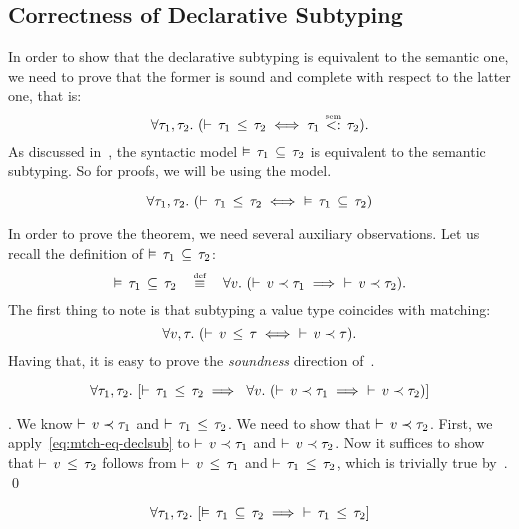 \subsection{Correctness of Declarative Subtyping}

In order to show that the declarative subtyping is equivalent
to the semantic one,
we need to prove that the former is sound and complete with respect
to the latter one, that is:
\[
\forall \ty_1, \ty_2.\ (\bjsub{\ty_1}{\ty_2} \iff \bjtruesemsub{\ty_1}{\ty_2}).
\]
As discussed in~, 
the syntactic model $\vDash \, \tau_1 \, \subseteq \, \tau_2$ is equivalent 
to the semantic subtyping.
So for proofs, we will be using the model.

\begin{theorem}\label{thm:declsub-correct}
\[
\forall \ty_1, \ty_2.\ (\bjsub{\ty_1}{\ty_2} \iff\ \bjsemsub{\ty_1}{\ty_2})
\]
\end{theorem}

In order to prove the theorem, we need several auxiliary observations.
Let us recall the definition of $\vDash \, \tau_1 \, \subseteq \, \tau_2$:
\[
\bjsemsub{\ty_1}{\ty_2} \quad \defsign \quad
\forall \vty.\ (\bjmtch{\vty}{\ty_1} \implies\ \bjmtch{\vty}{\ty_2}).
\]
The first thing to note is that
subtyping a value type coincides with matching:
\begin{equation}\label{eq:mtch-eq-declsub}
\forall \vty, \ty.\ (\bjsub{\vty}{\ty} \iff\ \bjmtch{\vty}{\ty}).
\end{equation}
Having that, it is easy to prove the \emph{soundness} direction
of~.
\begin{lemma}
\[
\forall \ty_1, \ty_2.\ 
[\bjsub{\ty_1}{\ty_2} \implies\ 
\forall \vty.\ (\bjmtch{\vty}{\ty_1} \implies\ \bjmtch{\vty}{\ty_2})]
\]
\end{lemma}
\noindent
\Proof. We know $\vdash \, v \prec \tau_1$ and $\vdash \, \tau_1 \, \leq \, \tau_2$.
We need to show that $\vdash \, v \prec \tau_2$.
First, we apply~\eqref{eq:mtch-eq-declsub} to $\vdash \, v \prec \tau_1$
and $\vdash \, v \prec \tau_2$. 
Now it suffices to show that $\vdash \, v \, \leq \, \tau_2$ follows from
$\vdash \, v \, \leq \, \tau_1$ and $\vdash \, \tau_1 \, \leq \, \tau_2$, 
which is trivially true by~\RD{Trans}.
\qed

\begin{lemma}\label{lem:declsub-complete}
\[	
\forall \ty_1, \ty_2.\ 
[\bjsemsub{\ty_1}{\ty_2} \implies\ \bjsub{\ty_1}{\ty_2}]
\]
\end{lemma}

